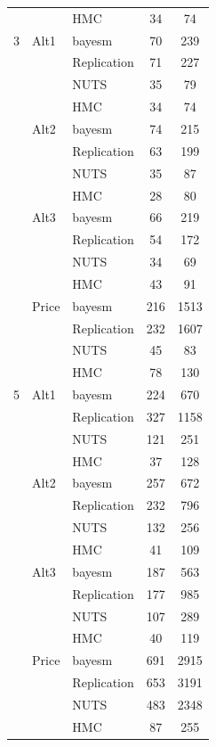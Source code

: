 \begin{longtable}{cllcc}
 &  & HMC & 34 & 74 \\
3 & Alt1 & bayesm & 70 & 239 \\
 &  & Replication & 71 & 227 \\
 &  & NUTS & 35 & 79 \\
 &  & HMC & 34 & 74 \\
 & Alt2 & bayesm & 74 & 215 \\
 &  & Replication & 63 & 199 \\
 &  & NUTS & 35 & 87 \\
 &  & HMC & 28 & 80 \\
 & Alt3 & bayesm & 66 & 219 \\
 &  & Replication & 54 & 172 \\
 &  & NUTS & 34 & 69 \\
 &  & HMC & 43 & 91 \\
 & Price & bayesm & 216 & 1513 \\
 &  & Replication & 232 & 1607 \\
 &  & NUTS & 45 & 83 \\
 &  & HMC & 78 & 130 \\
5 & Alt1 & bayesm & 224 & 670 \\
 &  & Replication & 327 & 1158 \\
 &  & NUTS & 121 & 251 \\
 &  & HMC & 37 & 128 \\
 & Alt2 & bayesm & 257 & 672 \\
 &  & Replication & 232 & 796 \\
 &  & NUTS & 132 & 256 \\
 &  & HMC & 41 & 109 \\
 & Alt3 & bayesm & 187 & 563 \\
 &  & Replication & 177 & 985 \\
 &  & NUTS & 107 & 289 \\
 &  & HMC & 40 & 119 \\
 & Price & bayesm & 691 & 2915 \\
 &  & Replication & 653 & 3191 \\
 &  & NUTS & 483 & 2348 \\
 &  & HMC & 87 & 255 \\
\end{longtable}

